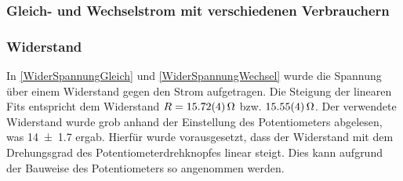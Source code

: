 \documentclass[
	a4paper,
	12pt,
	pagesize,
	ngerman
]{scrartcl}
\begin{document}
	\subsubsection{Gleich- und Wechselstrom mit verschiedenen Verbrauchern}
	\subsubsection*{Widerstand}
	In \cref{WiderSpannungGleich} und \cref{WiderSpannungWechsel} wurde die Spannung über einem Widerstand gegen den Strom aufgetragen. 
	Die Steigung der linearen Fits entspricht dem Widerstand $R = \SI{15,72 \pm 0,04}{\Omega}$ bzw. $\SI{15,55 \pm 0,04}{\Omega}$. 
	Der verwendete Widerstand wurde grob anhand der Einstellung des Potentiometers abgelesen, was \SI{14 \pm 1,7}{\Omega} ergab.
	Hierfür wurde vorausgesetzt, dass der Widerstand mit dem Drehungsgrad des Potentiometerdrehknopfes linear steigt.
	Dies kann aufgrund der Bauweise des Potentiometers so angenommen werden.
\end{document}
